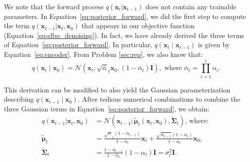 \documentclass[11pt,addpoints,answers]{exam}
\newcommand{\xv}{\mathbf{x}}
\newcommand{\epsilonv   }{\boldsymbol \epsilon   }
\newcommand{\muv        }{\boldsymbol \mu        }
\begin{document}
\begin{questions}
    We note that the forward process $q(\xv_t | \xv_{t-1})$  does not contain any trainable parameters.
    In Equation~\ref{eq:posterior_forward}, we did the first step to compute the term $q(\xv_{t-1} | \xv_t, \xv_0)$ that appears in our objective function (Equation~\ref{eq:elbo_denoising}). In fact, we have already derived the three terms of Equation~\ref{eq:posterior_forward}. In particular, $q(\xv_{t} \mid \xv_{t-1})$ is given by Equation~\ref{eq:encoder}. From Problem \ref{sec:rep}, we also know that:
\begin{equation}
    q(\xv_t \mid  \xv_{0})=\mathcal{N}(\xv_t;\sqrt{\bar{\alpha}}_t \xv_{0},(1-\bar{\alpha}_{t})  \boldsymbol{I}), \text{ where } \bar{\alpha}_t=\prod_{i=1}^{t} \alpha_i.
\label{eq:encoder_3}
\end{equation}
    \par
    This derivation can be modified to also yield the Gaussian parameterization describing   $q(\xv_{t-1} \mid  \xv_{0})$. After tedious numerical combinations to combine the three Gaussian terms in Equation~\ref{eq:posterior_forward}, we obtain:
    \begin{equation}
        \begin{aligned}
           q(\xv_{t-1} | \xv_t, \xv_0) &= \mathcal{N}(\xv_{t-1}; \tilde{\muv}_t(\xv_t, \xv_0),\tilde{\boldsymbol{\Sigma}}_t)   \text{, where: } \\
              \tilde{\muv}_t & = {\frac{\sqrt\alpha_t(1 - \bar\alpha_{t-1})}{1 - \bar \alpha_t}} \xv_t + {\frac{\sqrt{\bar\alpha_{t-1}}(1-\alpha_t)}{1 - \bar\alpha_t}} \xv_0, \\
            \tilde{\boldsymbol{\Sigma}}_t & = \frac{1 - \bar \alpha_{t-1}}{1 - \bar \alpha_t} (1-\alpha_t) \boldsymbol{I} = \sigma_t^2 \boldsymbol{I}.
        \end{aligned}
    \end{equation}


\end{questions}
\end{document}
